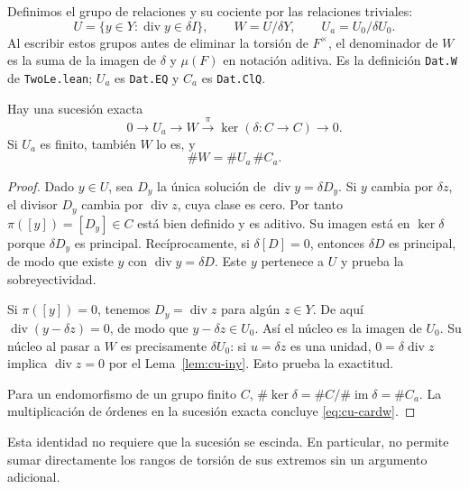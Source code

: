 Definimos el grupo de relaciones y su cociente por las relaciones triviales:
\begin{equation}
 U=\{y\in Y:\operatorname{div}y\in\delta I\},\qquad
 W=U/\delta Y,\qquad U_a=U_0/\delta U_0.
 \label{eq:cu-w}
\end{equation}
Al escribir estos grupos antes de eliminar la torsión de $F^\times$, el denominador de $W$ es la suma de la imagen de $\delta$ y $\mu(F)$ en notación aditiva. Es la definición \texttt{Dat.W} de \texttt{TwoLe.lean}; $U_a$ es \texttt{Dat.EQ} y $C_a$ es \texttt{Dat.ClQ}.

\begin{proposicion}
\label{prop:cu-exacta}
Hay una sucesión exacta
\begin{equation}
 0\longrightarrow U_a\longrightarrow W
 \xrightarrow{\pi}\ker(\delta:C\to C)\longrightarrow0.
 \label{eq:cu-exacta}
\end{equation}
Si $U_a$ es finito, también $W$ lo es, y
\begin{equation}
 \#W=\#U_a\,\#C_a.
 \label{eq:cu-cardw}
\end{equation}
\end{proposicion}
\begin{proof}
Dado $y\in U$, sea $D_y$ la única solución de $\operatorname{div}y=\delta D_y$. Si $y$ cambia por $\delta z$, el divisor $D_y$ cambia por $\operatorname{div}z$, cuya clase es cero. Por tanto $\pi([y])=[D_y]\in C$ está bien definido y es aditivo. Su imagen está en $\ker\delta$ porque $\delta D_y$ es principal. Recíprocamente, si $\delta[D]=0$, entonces $\delta D$ es principal, de modo que existe $y$ con $\operatorname{div}y=\delta D$. Este $y$ pertenece a $U$ y prueba la sobreyectividad.

Si $\pi([y])=0$, tenemos $D_y=\operatorname{div}z$ para algún $z\in Y$. De aquí $\operatorname{div}(y-\delta z)=0$, de modo que $y-\delta z\in U_0$. Así el núcleo es la imagen de $U_0$. Su núcleo al pasar a $W$ es precisamente $\delta U_0$: si $u=\delta z$ es una unidad, $0=\delta\operatorname{div}z$ implica $\operatorname{div}z=0$ por el Lema~\ref{lem:cu-iny}. Esto prueba la exactitud.

Para un endomorfismo de un grupo finito $C$, $\#\ker\delta=\#C/\#\operatorname{im}\delta=\#C_a$. La multiplicación de órdenes en la sucesión exacta concluye \eqref{eq:cu-cardw}.
\end{proof}

Esta identidad no requiere que la sucesión se escinda. En particular, no permite sumar directamente los rangos de torsión de sus extremos sin un argumento adicional.

